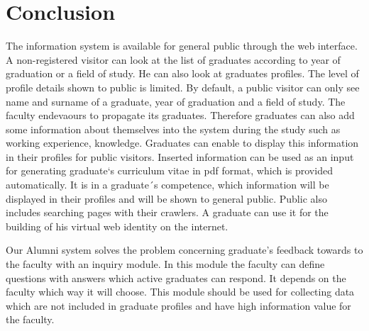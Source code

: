 \documentclass{iitsrc}[2006/14/02]
\begin{document}
\section{Conclusion}

The information system is available for general public through the web interface. A non-registered visitor can look at the list of graduates according to year of graduation or a field of study. He can also look at graduates profiles. The level of profile details shown to public is limited. By default, a public visitor can only see name and surname of a graduate, year of graduation and a field of study. The faculty endevaours  to propagate its graduates. Therefore graduates can also add some information about themselves into the system during the study such as working experience, knowledge. Graduates can enable to display this information in their profiles for public visitors. Inserted information can be used as an input for generating graduate`s curriculum vitae in pdf format, which is provided automatically. It is in a graduate´s competence, which information will be displayed in their profiles and will be shown to general public. Public also includes searching pages with their crawlers. A graduate can use it for the building of his virtual web identity on the internet. 

Our Alumni system solves the problem concerning graduate’s feedback towards to the faculty with an inquiry module. In this module the faculty can define questions with answers which active graduates can respond. It depends on the faculty which way it will choose. This module should be used for collecting data which are not included in graduate profiles and have high information value for the faculty.

  

\nocite{team14}
\nocite{team15}
\nocite{cakephp}



\end{document}
